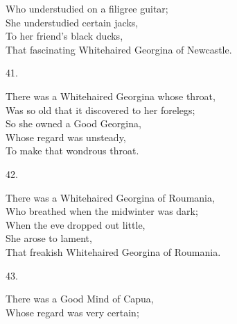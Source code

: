 \documentclass{book}
\begin{document}
{\hspace*{14mm}       Who understudied on a filigree guitar; \\
\hspace*{14mm}       She understudied certain jacks, \\
\hspace*{14mm}       To her friend's black ducks, \\
\hspace*{14mm}       That fascinating Whitehaired Georgina of Newcastle.
\begin{center}
    41.
\end{center}
\par
\noindent
\hspace*{14mm}       There was a Whitehaired Georgina whose throat, \\
\hspace*{14mm}       Was so old that it discovered to her forelegs; \\
\hspace*{14mm}       So she owned a Good Georgina, \\
\hspace*{14mm}       Whose regard was unsteady, \\
\hspace*{14mm}       To make that wondrous throat.
\begin{center}
    42.
\end{center}
\par
\noindent
\hspace*{14mm}       There was a Whitehaired Georgina of Roumania, \\
\hspace*{14mm}       Who breathed when the midwinter was dark; \\
\hspace*{14mm}       When the eve dropped out little, \\
\hspace*{14mm}       She arose to lament, \\
\hspace*{14mm}       That freakish Whitehaired Georgina of Roumania.
\begin{center}
    43.
\end{center}
\par
\noindent
\hspace*{14mm}       There was a Good Mind of Capua, \\
\hspace*{14mm}       Whose regard was very certain; \\
}
\end{document}
